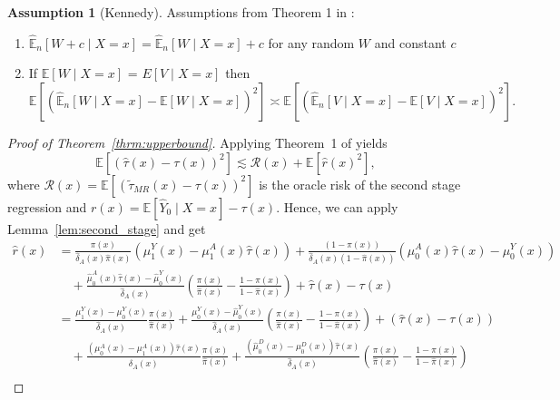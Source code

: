 \documentclass[nonatbib]{article}
\newcommand{\E}{\mathbb{E}}
\theoremstyle{definition}
\newtheorem{assumption}{Assumption}
\theoremstyle{plain}
\begin{document}
\begin{assumption}[Kennedy]
Assumptions from Theorem 1 in \cite{Kennedy.2020}:
\begin{enumerate}
        \item $\hat{\E}_n[W + c \mid X = x] = \hat{\E}_n[W \mid X = x] + c$ for any random $W$ and constant $c$
    \item If $\E[W \mid X = x]$ = $E[V \mid X = x]$ then
    \begin{equation}
        \E\left[\left(\hat{\E}_n[W \mid X = x] - \E[W \mid X = x] \right)^2\right] \asymp \E\left[\left(\hat{\E}_n[V \mid X = x] - \E[V \mid X = x] \right)^2\right].
    \end{equation}
\end{enumerate}
\end{assumption}
\begin{proof}[Proof of Theorem~\ref{thrm:upperbound}]
Applying Theorem~1 of \cite{Kennedy.2020} yields
\begin{equation}
    \E\left[\left(\hat{\tau}(x) - \tau(x)\right)^2\right] \lesssim  \mathcal{R}(x) + \E\left[\hat{r}(x)^2 \right],
\end{equation}
where $\mathcal{R}(x) = \E\left[\left(\widetilde{\tau}_{MR}(x) - \tau(x)\right)^2\right]$ is the oracle risk of the second stage regression and $r(x) = \E[\hat{Y}_0 \mid X = x] - \tau(x)$.
Hence, we can apply Lemma~\ref{lem:second_stage} and get
\begin{align}
   \hat{r}(x) &=  \frac{\pi(x)}{\hat{\delta}_A(x) \hat{\pi}(x)} \left(\mu_1^Y(x) - \mu_1^A(x)\hat{\tau}(x)\right)
   + \frac{(1-\pi(x))}{\hat{\delta}_A(x)(1 - \hat{\pi}(x))} \left(\mu_0^A(x) \hat{\tau}(x) -\mu_0^Y(x) \right)\\ & \quad + 
   \frac{\hat{\mu}_0^A(x) \hat{\tau}(x) - \hat{\mu}_0^Y (x)}{\hat{\delta}_A(x)} \left(\frac{\pi(x)}{\hat{\pi}(x)} - \frac{1- \pi(x)}{1-\hat{\pi}(x)} \right) + \hat{\tau}(x) - \tau(x) \\
   &= \frac{\mu_1^Y(x) - \mu_0^Y(x)}{\hat{\delta}_A(x)} \frac{\pi(x)}{\hat{\pi}(x)} + \frac{\mu_0^Y(x) - \hat{\mu}_0^Y(x)}{\hat{\delta}_A(x)} \left(  \frac{\pi(x)}{\hat{\pi}(x)} -  \frac{1 - \pi(x)}{1 - \hat{\pi}(x)} \right)  + \left(\hat{\tau}(x) - \tau(x)\right)\\
   & \quad + \frac{(\mu_0^A(x) - \mu_1^A(x)) \hat{\tau}(x)}{\hat{\delta}_A(x)} \frac{\pi(x)}{\hat{\pi}(x)} + \frac{(\hat{\mu}_0^D(x) - \mu_0^D(x))\hat{\tau}(x)}{\hat{\delta}_A(x)} \left(  \frac{\pi(x)}{\hat{\pi}(x)} -  \frac{1 - \pi(x)}{1 - \hat{\pi}(x)} \right) \\

\end{align}
\end{proof}
\end{document}
